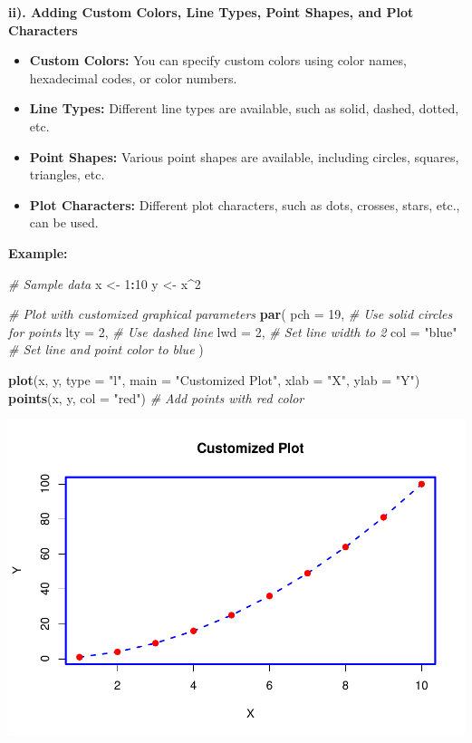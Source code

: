 \documentclass[
]{book}
\newenvironment{Shaded}{\begin{snugshade}}{\end{snugshade}}
\newcommand{\AttributeTok}[1]{\textcolor[rgb]{0.13,0.29,0.53}{#1}}
\newcommand{\CommentTok}[1]{\textcolor[rgb]{0.56,0.35,0.01}{\textit{#1}}}
\newcommand{\DecValTok}[1]{\textcolor[rgb]{0.00,0.00,0.81}{#1}}
\newcommand{\FunctionTok}[1]{\textcolor[rgb]{0.13,0.29,0.53}{\textbf{#1}}}
\newcommand{\NormalTok}[1]{#1}
\newcommand{\OtherTok}[1]{\textcolor[rgb]{0.56,0.35,0.01}{#1}}
\newcommand{\SpecialCharTok}[1]{\textcolor[rgb]{0.81,0.36,0.00}{\textbf{#1}}}
\newcommand{\StringTok}[1]{\textcolor[rgb]{0.31,0.60,0.02}{#1}}
\providecommand{\tightlist}{%
  \setlength{\itemsep}{0pt}\setlength{\parskip}{0pt}}
\begin{document}
\textbf{ii). Adding Custom Colors, Line Types, Point Shapes, and Plot Characters}

\begin{itemize}
\tightlist
\item
  \textbf{Custom Colors:} You can specify custom colors using color names, hexadecimal codes, or color numbers.
\item
  \textbf{Line Types:} Different line types are available, such as solid, dashed, dotted, etc.
\item
  \textbf{Point Shapes:} Various point shapes are available, including circles, squares, triangles, etc.
\item
  \textbf{Plot Characters:} Different plot characters, such as dots, crosses, stars, etc., can be used.
\end{itemize}

\textbf{Example:}

\begin{Shaded}
\begin{Highlighting}[]
\CommentTok{\# Sample data}
\NormalTok{x }\OtherTok{\textless{}{-}} \DecValTok{1}\SpecialCharTok{:}\DecValTok{10}
\NormalTok{y }\OtherTok{\textless{}{-}}\NormalTok{ x}\SpecialCharTok{\^{}}\DecValTok{2}

\CommentTok{\# Plot with customized graphical parameters}
\FunctionTok{par}\NormalTok{(}
  \AttributeTok{pch =} \DecValTok{19}\NormalTok{,    }\CommentTok{\# Use solid circles for points}
  \AttributeTok{lty =} \DecValTok{2}\NormalTok{,     }\CommentTok{\# Use dashed line}
  \AttributeTok{lwd =} \DecValTok{2}\NormalTok{,     }\CommentTok{\# Set line width to 2}
  \AttributeTok{col =} \StringTok{"blue"} \CommentTok{\# Set line and point color to blue}
\NormalTok{)}

\FunctionTok{plot}\NormalTok{(x, y, }\AttributeTok{type =} \StringTok{"l"}\NormalTok{, }\AttributeTok{main =} \StringTok{"Customized Plot"}\NormalTok{, }\AttributeTok{xlab =} \StringTok{"X"}\NormalTok{, }\AttributeTok{ylab =} \StringTok{"Y"}\NormalTok{)}
\FunctionTok{points}\NormalTok{(x, y, }\AttributeTok{col =} \StringTok{"red"}\NormalTok{) }\CommentTok{\# Add points with red color}
\end{Highlighting}
\end{Shaded}

\includegraphics{_main_files/figure-latex/unnamed-chunk-45-1.pdf}
\end{document}
